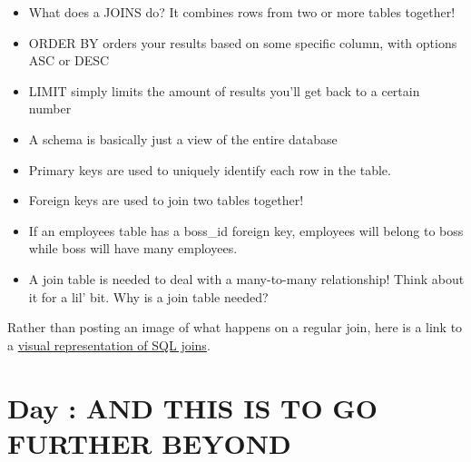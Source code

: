 \documentclass{42-en}
\begin{document}
	\begin{itemize}\itemsep1pt 
		\item What does a JOINS do? It combines rows from two or more tables together! 
		\item ORDER BY orders your results based on some specific column, with options ASC or DESC
		\item LIMIT simply limits the amount of results you'll get back to a certain number
		\item A schema is basically just a view of the entire database 
		\item Primary keys are used to uniquely identify each row in the table. 
		\item Foreign keys are used to join two tables together!
		\item If an employees table has a boss\_id foreign key, employees will belong to boss while boss will have 
			many employees. 
		\item A join table is needed to deal with a many-to-many relationship! Think about it for a lil' bit. 
			Why is a join table needed? 
	\end{itemize}

	Rather than posting an image of what happens on a regular join, here is a link to a \href{https://blog.codinghorror.com/a-visual-explanation-of-sql-joins/}{visual representation 
	of SQL joins}.
\nextexercice


\chapter{Day \exercicenumber: AND THIS IS TO GO FURTHER BEYOND }

\makeheaderfiles
\end{document}
